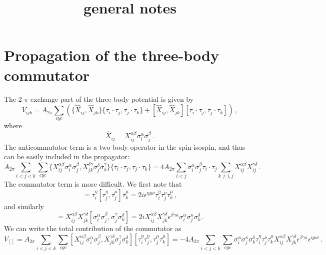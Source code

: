 \documentclass{article}
\title{general notes}
\begin{document}
\section{Propagation of the three-body commutator}
The 2-$\pi$ exchange part of the three-body potential is given by
\begin{equation}
V_{ijk} = A_{2\pi}\sum_{cyc} \left(\{\hat{X}_{ij},\hat{X}_{jk}\}
\{\tau_{i}\cdot\tau_{j},\tau_{j}\cdot\tau_{k}\}
+[\hat{X}_{ij},\hat{X}_{jk}]
     [\tau_{i}\cdot\tau_{j},\tau_{j}\cdot\tau_{k}] \right) \,,
\end{equation}
where 
\begin{equation}
\hat{X}_{ij}=X_{ij}^{\alpha\beta}\sigma_i^\alpha\sigma_j^\beta \,.
\end{equation}
The anticommutator term is a two-body operator in the spin-isospin,
and thus can be easily included in the propagator:
\begin{equation}
A_{2\pi}\sum_{i<j<k}\sum_{cyc} \{X_{ij}^{\alpha\beta}\sigma_i^\alpha\sigma_j^\beta,
X_{jk}^{\delta\gamma}\sigma_j^\delta\sigma_k^\gamma\}
\{\tau_{i}\cdot\tau_{j},\tau_{j}\cdot\tau_{k}\} =
4A_{2\pi}\sum_{i<j}\sigma_i^\alpha\sigma_j^\beta\tau_i\cdot\tau_j
\sum_{k\ne i,j}X_{ij}^{\alpha\beta}X_{ij}^{\gamma\delta} \,.
\end{equation}
The commutator term is more difficult.
We first note that 
\begin{equation}
[\tau_i^\eta\tau_j^\eta,\tau_j^\mu\tau_k^\mu]=
\tau_i^\eta[\tau_j^\eta,\tau_j^\mu]\tau_k^\mu=
2i\epsilon^{\eta\mu\nu}\tau_i^\eta\tau_j^\nu\tau_k^\mu \,,
\end{equation}
and similarly
\begin{equation}
[\sigma_i^\alpha X_{ij}^{\alpha\beta}\sigma_j^\beta,\sigma_j^\gamma X_{jk}^{\gamma\delta}\sigma_k^\delta] =
X_{ij}^{\alpha\beta}X_{jk}^{\gamma\delta}[\sigma_i^\alpha\sigma_j^\beta,\sigma_j^\gamma\sigma_k^\delta] =
2iX_{ij}^{\alpha\beta}X_{jk}^{\gamma\delta}\epsilon^{\beta\gamma\kappa}\sigma_i^\alpha\sigma_j^\kappa\sigma_k^\delta \,.
\end{equation}
We can write the total contribution of the commutator as
\begin{equation}
V_{[]}=
A_{2\pi}\sum_{i<j<k}\sum_{cyc} [X_{ij}^{\alpha\beta}\sigma_i^\alpha\sigma_j^\beta,
X_{jk}^{\gamma\delta}\sigma_j^\gamma\sigma_k^\delta]
[\tau_i^\eta\tau_j^\eta,\tau_j^\mu\tau_k^\mu] =
-4A_{2\pi}\sum_{i<j<k}\sum_{cyc}
\sigma_i^\alpha\sigma_j^\kappa\sigma_k^\delta\tau_i^\eta\tau_j^\nu\tau_k^\mu
X_{ij}^{\alpha\beta}X_{jk}^{\gamma\delta}\epsilon^{\beta\gamma\kappa}\epsilon^{\eta\mu\nu} \,.
\end{equation}
\end{document}
